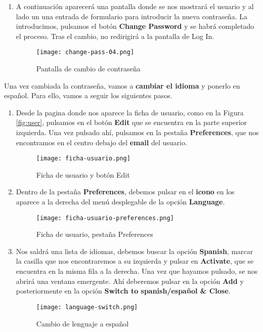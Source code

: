 \begin{enumerate}
    \item A continuación aparecerá una pantalla donde se nos mostrará el usuario y al lado un una entrada de formulario para introducir la nueva contraseña. La introducimos, pulsamos el botón \textbf{Change Password} y se habrá completado el proceso. Tras el cambio, no redirigirá a la pantalla de Log In.

    \begin{figure}[ht]
        \centering
        \texttt{[image: change-pass-04.png]}
        \caption{Pantalla de cambio de contraseña}
    \end{figure}
\end{enumerate}

Una vez cambiada la contraseña, vamos a \textbf{cambiar el idioma} y ponerlo en español. Para ello, vamos a seguir los siguientes pasos.

\begin{enumerate}
    \item Desde la pagina donde nos aparece la ficha de usuario, como en la Figura \ref{fig:user}, pulsamos en el botón \textbf{Edit} que se encuentra en la parte superior izquierda. Una vez pulsado ahí, pulsamos en la pestaña \textbf{Preferences}, que nos encontramos en el centro debajo del \textbf{email} del usuario.

    \vspace{10ex}

   \begin{figure}[ht]
       \centering
       \texttt{[image: ficha-usuario.png]}
       \caption{Ficha de usuario y botón Edit}
   \end{figure}

   \item Dentro de la pestaña \textbf{Preferences}, debemos pulsar en el \textbf{icono} en los aparece a la derecha del menú desplegable de la opción \textbf{Language}.

   \begin{figure}[ht]
       \centering
       \texttt{[image: ficha-usuario-preferences.png]}
       \caption{Ficha de usuario, pestaña Preferences}
   \end{figure}

   \item Nos saldrá una lista de idiomas, debemos buscar la opción \textbf{Spanish}, marcar la casilla que nos encontraremos a su izquierda y pulsar en \textbf{Activate}, que se encuentra en la misma fila a la derecha. Una vez que hayamos pulsado, se nos abrirá una ventana emergente. Ahí deberemos pulsar en la opción \textbf{Add} y posteriormente en la opción \textbf{Switch to spanish/español \& Close}.

    \vspace{15ex}
   \begin{figure}[ht]
       \centering
       \texttt{[image: language-switch.png]}
       \caption{Cambio de lenguaje a español}
       \label{fig:lang}
   \end{figure}
\end{enumerate}

